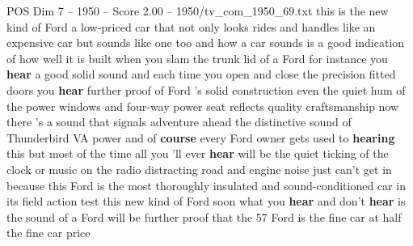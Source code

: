 \begin{textsample}{POS Dim 7 – 1950 – Score 2.00 – 1950/tv\_com\_1950\_69.txt}  \label{ex:f7_pos_010}
this is the new kind of Ford a low-priced car that not only looks rides and handles like an expensive car but sounds like one too and how a car sounds is a good indication of how well it is built when you slam the trunk lid of a Ford for instance you \textbf{hear} a good solid sound and each time you open and close the precision fitted doors you \textbf{hear} further proof of Ford 's solid construction even the quiet hum of the power windows and four-way power seat reflects quality craftsmanship now there 's a sound that signals adventure ahead the distinctive sound of Thunderbird VA power and of \textbf{course} every Ford owner gets used to \textbf{hearing} this but most of the time all you 'll ever \textbf{hear} will be the quiet ticking of the clock or music on the radio distracting road and engine noise just can't get in because this Ford is the most thoroughly insulated and sound-conditioned car in its field action test this new kind of Ford soon what you \textbf{hear} and don't \textbf{hear} is the sound of a Ford will be further proof that the 57 Ford is the fine car at half the fine car price

\end{textsample}
